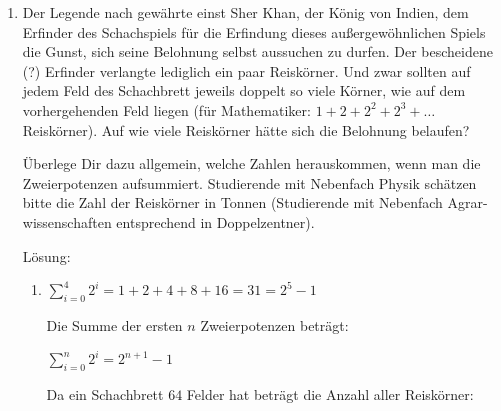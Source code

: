 \documentclass[../main.tex]{subfiles}
\begin{document}
\begin{enumerate}
	\item Der Legende nach gewährte einst Sher Khan, der König von Indien, dem Erfinder des Schachspiels für
	      die Erfindung dieses außergewöhnlichen Spiels die Gunst, sich seine Belohnung selbst aussuchen zu durfen.
	      Der bescheidene (?) Erfinder verlangte lediglich ein paar Reiskörner.
	      Und zwar sollten auf jedem Feld des Schachbrett jeweils doppelt so viele Körner,
	      wie auf dem vorhergehenden Feld liegen (für Mathematiker:
	      \begin{math}
		      1 + 2 + 2^2 + 2^3 + \dots
	      \end{math}
	      Reiskörner). Auf wie viele Reiskörner hätte sich die Belohnung belaufen?

	      Überlege Dir dazu allgemein, welche Zahlen herauskommen, wenn man die
	      Zweierpotenzen aufsummiert. Studierende mit Nebenfach Physik schätzen
	      bitte die Zahl der Reiskörner in Tonnen (Studierende mit Nebenfach Agrar-
	      wissenschaften entsprechend in Doppelzentner).

	      Lösung:
	      \begin{enumerate}
		      \item
		            \begin{math}
			            \sum_{i=0}^{4} 2^i = 1 + 2 + 4 + 8 + 16 = 31 = 2^5 - 1
		            \end{math}

		            Die Summe der ersten
		            \begin{math} n \end{math}
		            Zweierpotenzen beträgt:

		            \begin{math}
			            \sum_{i=0}^{n} 2^i = 2^{n+1} - 1
		            \end{math}

		            Da ein Schachbrett \begin{math}
			            64
		            \end{math} Felder hat beträgt die Anzahl aller Reiskörner:


\end{enumerate}
\end{enumerate}
\end{document}
